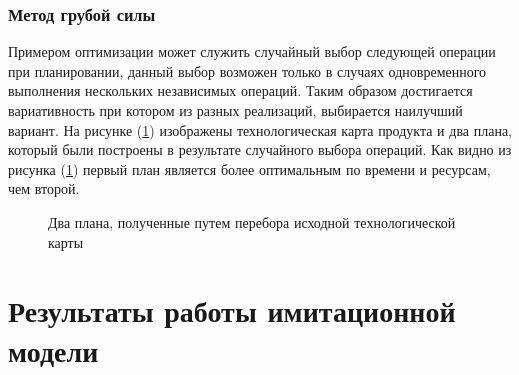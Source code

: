 \subsubsection{Метод грубой силы}
Примером оптимизации может служить случайный выбор следующей операции при планировании, данный выбор возможен только в случаях одновременного выполнения нескольких независимых операций. Таким образом достигается вариативность при котором из разных реализаций, выбирается наилучший вариант. На рисунке (\ref{ris:Force}) изображены технологическая карта продукта и два плана, который были построены в результате случайного выбора операций. Как видно из рисунка (\ref{ris:Force}) первый план является более оптимальным по времени и ресурсам, чем второй.

\begin{figure}[H]
    \caption{Два плана, полученные путем перебора исходной технологической карты}
    \label{ris:Force}
\end{figure}

\section{Результаты работы имитационной модели}
